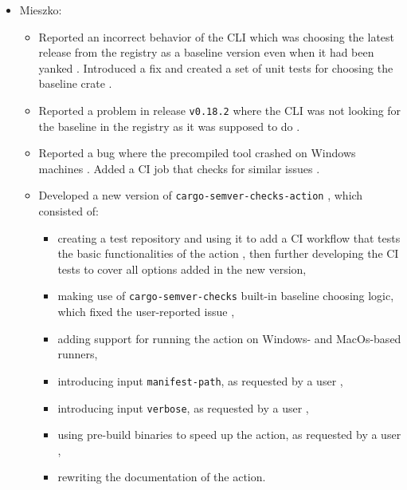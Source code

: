\documentclass[licencjacka,en]{pracamgr}
\begin{document}
\begin{itemize}
	\item Mieszko:
		\begin{itemize}
			\item Reported an incorrect behavior of the CLI which was choosing the latest release from the registry as
				a baseline version even when it had been yanked \cite{issue_choosing_baseline}. Introduced a fix and
				created a set of unit tests for choosing the baseline crate \cite{pr_choosing_baseline}.

			\item Reported a problem in release \texttt{v0.18.2} where the CLI was not looking for the baseline in the
				registry as it was supposed to do \cite{issue_finding_registry_baseline}.

			\item Reported a bug where the precompiled tool crashed on Windows machines \cite{issue_fail_on_windows}.
				Added a CI job that checks for similar issues \cite{pr_fail_on_windows} \cite{pr_ci_windows_comment}.

			\item Developed a new version of \texttt{cargo-semver-checks-action} \cite{pr_action_v2}
				\cite{pr_action_inputs_issues}, which consisted of:
			\begin{itemize}
				\item creating a test repository \cite{repo_action_tests} and using it to add a CI workflow that tests
					the basic functionalities of the action \cite{pr_action_first_tests}, then further developing the
					CI tests to cover all options added in the new version,
				\item making use of \texttt{cargo-semver-checks} built-in baseline choosing logic, which fixed the
					user-reported issue \cite{issue_action_builtin_logic},
				\item adding support for running the action on Windows- and MacOs-based runners,
				\item introducing input \texttt{manifest-path}, as requested by a user
					\cite{issue_action_manifest_path},
				\item introducing input \texttt{verbose}, as requested by a user \cite{issue_action_verbose},
				\item using pre-build binaries to speed up the action, as requested by a user
					\cite{issue_action_binaries},
				\item rewriting the documentation of the action.
			\end{itemize}


\end{itemize}
\end{itemize}
\end{document}
